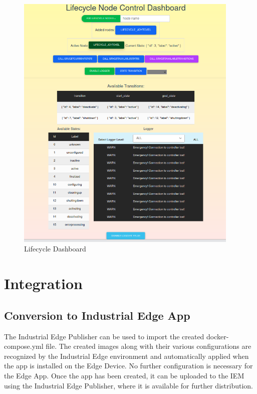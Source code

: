 \begin{figure}[H]
	\centering
	\includegraphics[width=0.95\textwidth]{"Bilder/lifecycle-dashboard.png"}
	\caption{Lifecycle Dashboard}
	\label{fig:Background:LifecycleDashboard}					
\end{figure}

\section{Integration}
\label{Implementierung:Integration}

\subsection{Conversion to Industrial Edge App} 
The Industrial Edge Publisher can be used to import the created docker-compose.yml file. The created images along with their various configurations are recognized by the Industrial Edge environment and automatically applied when the app is installed on the Edge Device. No further configuration is necessary for the Edge App. Once the app has been created, it can be uploaded to the IEM using the Industrial Edge Publisher, where it is available for further distribution.

